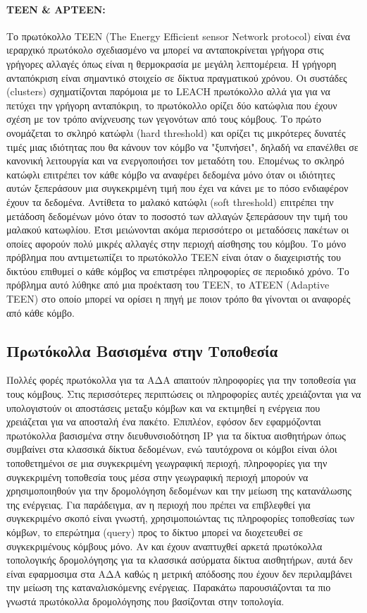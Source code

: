 \paragraph{TEEN \& APTEEN:} Το πρωτόκολλο TEEN (The Energy Efficient sensor Network protocol) \cite{teen_protocol} είναι ένα
ιεραρχικό πρωτόκολο σχεδιασμένο να μπορεί να ανταποκρίνεται γρήγορα στις γρήγορες αλλαγές όπως είναι η θερμοκρασία με μεγάλη λεπτομέρεια. Η γρήγορη ανταπόκριση είναι
σημαντικό στοιχείο σε δίκτυα πραγματικού χρόνου. Οι συστάδες (clusters) σχηματίζονται παρόμοια με το LEACH πρωτόκολλο αλλά για για να πετύχει την γρήγορη ανταπόκριη,
το πρωτόκολλο ορίζει δύο κατώφλια που έχουν σχέση με τον τρόπο ανίχνευσης των γεγονότων από τους κόμβους. Το πρώτο ονομάζεται το σκληρό κατώφλι (hard threshold) και
ορίζει τις μικρότερες δυνατές τιμές μιας ιδιότητας που θα κάνουν τον κόμβο να "ξυπνήσει", δηλαδή να επανέλθει σε κανονική λειτουργία και να ενεργοποιήσει τον μεταδότη
του. Επομένως το σκληρό κατώφλι επιτρέπει τον κάθε κόμβο να αναφέρει δεδομένα μόνο όταν οι ιδιότητες αυτών ξεπεράσουν μια συγκεκριμένη τιμή που έχει να κάνει με το
πόσο ενδιαφέρον έχουν τα δεδομένα. Αντίθετα το μαλακό κατώφλι (soft threshold) επιτρέπει την μετάδοση δεδομένων μόνο όταν το ποσοστό των αλλαγών ξεπεράσουν την τιμή
του μαλακού κατωφλίου. Έτσι μειώνονται ακόμα περισσότερο οι μεταδόσεις πακέτων οι οποίες αφορούν πολύ μικρές αλλαγές στην περιοχή αίσθησης του κόμβου. Το μόνο
πρόβλημα που αντιμετωπίζει το πρωτόκολλο TEEN είναι όταν ο διαχειριστής του δικτύου επιθυμεί ο κάθε κόμβος να επιστρέφει πληροφορίες σε περιοδικό χρόνο. Το πρόβλημα
αυτό λύθηκε από μια προέκταση του TEEN, το ATEEN (Adaptive TEEN) \cite{apteen_protocol} στο οποίο μπορεί να ορίσει η πηγή με ποιον τρόπο θα γίνονται οι αναφορές από
κάθε κόμβο.


\subsection{Πρωτόκολλα Βασισμένα στην Τοποθεσία}
Πολλές φορές πρωτόκολλα για τα ΑΔΑ απαιτούν πληροφορίες για την τοποθεσία για τους κόμβους.
Στις περισσότερες περιπτώσεις οι πληροφορίες αυτές χρειάζονται για να υπολογιστούν οι αποστάσεις μεταξυ κόμβων και να εκτιμηθεί η ενέργεια που χρειάζεται για να
αποσταλή ένα πακέτο.
Επιπλέον, εφόσον δεν εφαρμόζονται πρωτόκολλα βασισμένα στην διευθυνσιοδότηση IP για τα δίκτυα αισθητήρων όπως συμβαίνει στα κλασσικά δίκτυα δεδομένων, ενώ ταυτόχρονα
οι κόμβοι είναι όλοι τοποθετημένοι σε μια συγκεκριμένη γεωγραφική περιοχή, πληροφορίες για την συγκεκριμένη τοποθεσία τους μέσα στην γεωγραφική περιοχή μπορούν
να χρησιμοποιηθούν για την δρομολόγηση δεδομένων και την μείωση της κατανάλωσης της ενέργειας.
Για παράδειγμα, αν η περιοχή που πρέπει να επιβλεφθεί για συγκεκριμένο σκοπό είναι γνωστή, χρησιμοποιώντας τις πληροφορίες τοποθεσίας των κόμβων, το επερώτημα (query)
προς το δίκτυο μπορεί να διοχετευθεί σε συγκεκριμένους κόμβους μόνο.
Αν και έχουν αναπτυχθεί αρκετά πρωτόκολλα τοπολογικής δρομολόγησης για τα κλασσικά ασύρματα δίκτυα αισθητήρων, αυτά δεν είναι εφαρμοσιμα στα ΑΔΑ καθώς η μετρική
απόδοσης που έχουν δεν περιλαμβάνει την μείωση της καταναλισκόμενης ενέργειας. Παρακάτω παρουσιάζονται τα πιο γνωστά πρωτόκολλα δρομολόγησης που βασίζονται στην
τοπολογία.


